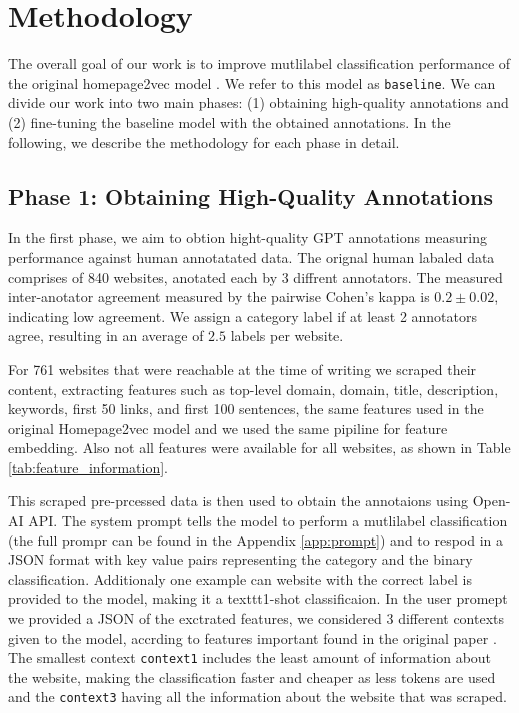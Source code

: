 \section{Methodology}\label{sec:methods}

The overall goal of our work is to improve mutlilabel classification performance of the original homepage2vec model \cite{homepage2vec}. 
We refer to this model as \texttt{baseline}. 
We can divide our work into two main phases: (1) obtaining high-quality annotations and (2) fine-tuning the baseline model with the obtained annotations. 
In the following, we describe the methodology for each phase in detail.

\subsection* {Phase 1: Obtaining High-Quality Annotations}
In the first phase, we aim to obtion hight-quality GPT annotations measuring performance against human annotatated data.
The orignal human labaled data comprises of 840 websites, anotated each by 3 diffrent annotators. 
The measured inter-anotator agreement measured by the pairwise Cohen's kappa \cite{cohen-coef} is $0.2 \pm 0.02$, indicating low agreement. 
We assign a category label if at least 2 annotators agree, resulting in an average of $2.5$ labels per website.

For 761 websites that were reachable at the time of writing we scraped their content, extracting features such as top-level domain, domain, title, description, keywords, first 50 links, and first 100 sentences, the same features used in the original Homepage2vec model \cite{homepage2vec} and we used the same pipiline for feature embedding.
Also not all features were available for all websites, as shown in Table \ref{tab:feature_information}.


This scraped pre-prcessed data is then used to obtain the annotaions using Open-AI API.
The system prompt tells the model to perform a mutlilabel classification (the full prompr can be found in the Appendix \ref{app:prompt}) and to respod in a JSON format with key value pairs representing the category and the binary classification. Additionaly one example can website with the correct label is provided to the model, making it a texttt{1-shot} classificaion.
In the user promept we provided a JSON of the exctrated features, we considered 3 different contexts given to the model, accrding to features important found in the original paper \cite{homepage2vec}. 
The smallest context \texttt{context1} includes the least amount of information about the website, making the classification faster and cheaper as less tokens are used and the \texttt{context3} having all the information about the website that was scraped.

